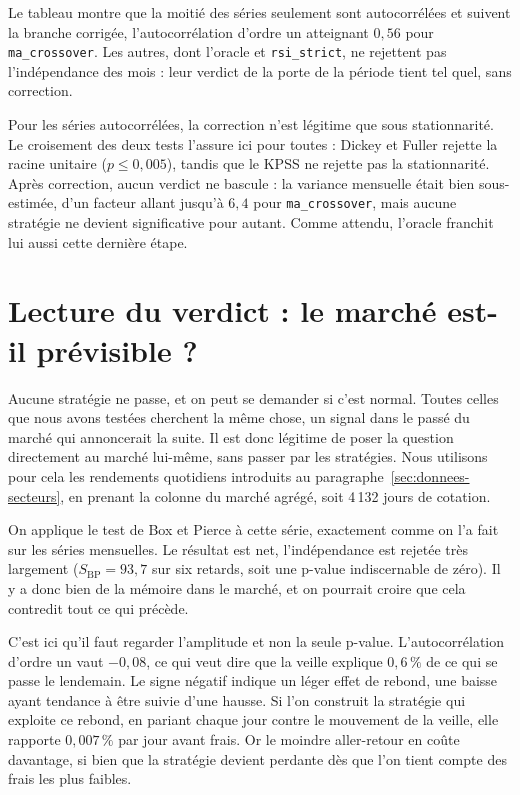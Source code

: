 Le tableau montre que la moitié des séries seulement sont autocorrélées et
suivent la branche corrigée, l'autocorrélation d'ordre un atteignant $0{,}56$
pour \texttt{ma\_crossover}. Les autres, dont l'oracle et \texttt{rsi\_strict},
ne rejettent pas l'indépendance des mois : leur verdict de la porte de la
période tient tel quel, sans correction.

Pour les séries autocorrélées, la correction n'est légitime que sous
stationnarité. Le croisement des deux tests l'assure ici pour toutes : Dickey
et Fuller rejette la racine unitaire ($p \le 0{,}005$), tandis que le KPSS ne
rejette pas la stationnarité. Après correction, aucun verdict ne bascule : la
variance mensuelle était bien sous-estimée, d'un facteur allant jusqu'à
$6{,}4$ pour \texttt{ma\_crossover}, mais aucune stratégie ne devient
significative pour autant. Comme attendu, l'oracle franchit lui aussi cette
dernière étape.


\section{Lecture du verdict : le marché est-il prévisible ?}
\label{sec:b1-efficience}

Aucune stratégie ne passe, et on peut se demander si c'est normal. Toutes
celles que nous avons testées cherchent la même chose, un signal dans le passé
du marché qui annoncerait la suite. Il est donc légitime de poser la question
directement au marché lui-même, sans passer par les stratégies. Nous
utilisons pour cela les rendements quotidiens introduits au
paragraphe~\ref{sec:donnees-secteurs}, en prenant la colonne du marché
agrégé, soit 4\,132 jours de cotation.

On applique le test de Box et Pierce à cette série, exactement comme on l'a
fait sur les séries mensuelles. Le résultat est net, l'indépendance est
rejetée très largement ($S_{\mathrm{BP}} = 93{,}7$ sur six retards, soit une
p-value indiscernable de zéro). Il y a donc bien de la mémoire dans le marché,
et on pourrait croire que cela contredit tout ce qui précède.

C'est ici qu'il faut regarder l'amplitude et non la seule p-value.
L'autocorrélation d'ordre un vaut $-0{,}08$, ce qui veut dire que la veille
explique $0{,}6\,\%$ de ce qui se passe le lendemain. Le signe négatif indique
un léger effet de rebond, une baisse ayant tendance à être suivie d'une
hausse. Si l'on construit la stratégie qui exploite ce rebond, en pariant
chaque jour contre le mouvement de la veille, elle rapporte $0{,}007\,\%$ par
jour avant frais. Or le moindre aller-retour en coûte davantage, si bien que
la stratégie devient perdante dès que l'on tient compte des frais les plus
faibles.

